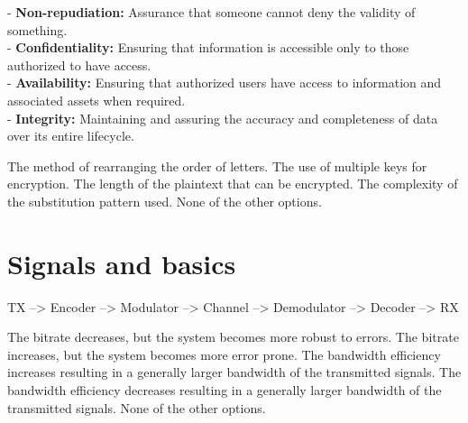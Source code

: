\begin{questions}
    \begin{solution}
        - \textbf{Non-repudiation:} Assurance that someone cannot deny the validity of something. \\
        - \textbf{Confidentiality:} Ensuring that information is accessible only to those authorized to have access. \\
        - \textbf{Availability:} Ensuring that authorized users have access to information and associated assets when required. \\
        - \textbf{Integrity:} Maintaining and assuring the accuracy and completeness of data over its entire lifecycle. \\
    \end{solution}

    \begin{checkboxes}
        \choice The method of rearranging the order of letters.
        \choice The use of multiple keys for encryption.
        \choice The length of the plaintext that can be encrypted.
        \CorrectChoice The complexity of the substitution pattern used.
        \choice None of the other options.
    \end{checkboxes}

    \section{Signals and basics}





    TX --> Encoder --> Modulator  --> Channel  --> Demodulator  --> Decoder  --> RX

    \begin{checkboxes}
        \choice The bitrate decreases, but the system becomes more robust to errors.
        \CorrectChoice The bitrate increases, but the system becomes more error prone.
        \choice The bandwidth efficiency increases resulting in a generally larger bandwidth of the transmitted signals.
        \choice The bandwidth efficiency decreases resulting in a generally larger bandwidth of the transmitted signals.
        \choice None of the other options.
    \end{checkboxes}



\end{questions}
